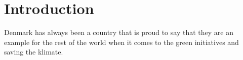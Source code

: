 \section{Introduction}
Denmark has always been a country that is proud to say that they are an example for the rest of the world when it comes to the green initiatives and saving the klimate.